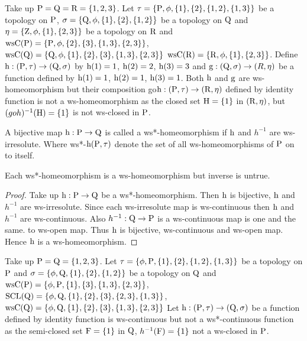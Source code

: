 \begin{exm}\label{exam5.2.16}
Take up $\mathrm{P}=\mathrm{Q}=\mathrm{R}= \{1, 2, 3\}$. Let $\tau= \{\TSP, \phi, \{1\}, \{2\}, \{1,2\},\break \{1,3\}\}$ be a topology on $\mathrm{P}$, $\sigma= \{\mathrm{Q}, \phi, \{1\}, \{2\}, \{1,2\}\}$ be a topology on $\mathrm{Q}$ and $\eta= \{\mathrm{Z}, \phi, \{1\}, \{2,3\}\}$ be a topology on $\mathrm{R}$ and $\mathrm{ws}\mathrm{C}(\mathrm{P})= \{\mathrm{P}, \phi, \{2\}, \{3\}, \{1, 3\}, \{2, 3\}\}$, $\mathrm{ws}\mathrm{C}(\mathrm{Q})= \{\mathrm{Q}, \phi, \{1\},\{2\}, \{3\}, \{1,3\}, \{2, 3\}\}$ $\mathrm{ws}\mathrm{C}(\mathrm{R})= \{\mathrm{R}, \phi, \{1\}, \{2, 3\}\}$. Define $\mathrm{h}: (\mathrm{P}, \tau) \to (\mathrm{Q},\sigma)$ by $\mathrm{h}(1)=1$, $\mathrm{h}(2) =2$, $\mathrm{h}(3)=3$ and $\mathrm{g}: (\mathrm{Q},\sigma)\to (R, \eta)$ be a function defined by $\mathrm{h}(1)=1$, $\mathrm{h}(2)= 1$, $\mathrm{h}(3)=1$. Both $\mathrm{h}$ and $\mathrm{g}$ are ws-homeomorphism but their composition go$\mathrm{h}: (\mathrm{P}, \tau)\to (\mathrm{R}, \eta)$ defined by identity function is not a ws-homeomorphism as the closed set $\mathrm{H}=\{1\}$ in $(\mathrm{R}, \eta)$, but $(goh)^{-1} (\mathrm{H})=\{1\}$ is not ws-closed in $\mathrm{P}$.
\end{exm}

\begin{dfn}\label{defi5.2.17}
A bijective map $\mathrm{h}: \mathrm{P}\to \mathrm{Q}$ is called a ws*-homeomorphism if $\mathrm{h}$ and $h^{-1}$ are ws-irresolute. Where ws*-$\mathrm{h}(\mathrm{P}, \tau)$ denote the set of all ws-homeomorphisms of $\mathrm{P}$ on to itself.
\end{dfn}

\begin{thm}\label{thm5.2.18}
Each ws*-homeomorphism is a ws-homeomorphism but inverse is untrue.
\end{thm}

\begin{proof}
Take up $\mathrm{h}: \mathrm{P}\to \mathrm{Q}$ be a ws*-homeomorphism. Then $\mathrm{h}$ is bijective, $\mathrm{h}$ and $h^{-1}$ are ws-irresolute. Since each ws-irresolute map is ws-continuous then $\mathrm{h}$ and $h^{-1}$ are ws-continuous. Also $h^{-1} : \mathrm{Q} \to \mathrm{P}$ is a ws-continuous map is one and the same. to ws-open map. Thus $\mathrm{h}$ is bijective, ws-continuous and ws-open map. Hence $\mathrm{h}$ is a ws-homeomorphism.
\end{proof}

\begin{exm}\label{exam5.2.19}
Take up $\mathrm{P}=\mathrm{Q}= \{1, 2, 3\}$. Let $\tau= \{\phi, \mathrm{P}, \{1\}, \{2\}, \{1,2\},\{1,3\}\}$ be a topology on $\mathrm{P}$ and $\sigma=\{\phi, \mathrm{Q}, \{1\}, \{2\},\{1,2\}\}$ be a topology on $\mathrm{Q}$ and $\ws\TSC(\TSP)\break = \{\phi, \TSP, \{1\},\{3\}, \{1,3\},\{2,3\}\}$, $\mathrm{SCL}(\mathrm{Q}) =\{\phi, \mathrm{Q}, \{1\},\{2\},\{3\},\{2, 3\},\{1,3\}\}$,\break $\mathrm{ws}\mathrm{C}(\mathrm{Q})= \{\phi, \mathrm{Q}, \{1\},\{2\},\{3\}, \{1,3\},\{2,3\}\}$ Let $\mathrm{h}: (\mathrm{P}, \tau )\to (\mathrm{Q}, \sigma)$ be a function defined by identity function is ws-continuous but not a ws*-continuous function as the semi-closed set $\mathrm{F}=\{1\}$ in $\mathrm{Q}$, $h^{-1}(\mathrm{F})=\{1\}$ not a ws-closed in $\mathrm{P}$.
\end{exm}

